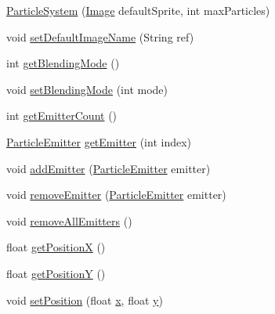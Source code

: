 \begin{DoxyCompactItemize}
\item 
\mbox{\hyperlink{classorg_1_1newdawn_1_1slick_1_1particles_1_1_particle_system_acee608ecfa74e7602861cef95dfae8dd}{Particle\+System}} (\mbox{\hyperlink{classorg_1_1newdawn_1_1slick_1_1_image}{Image}} default\+Sprite, int max\+Particles)
\item 
void \mbox{\hyperlink{classorg_1_1newdawn_1_1slick_1_1particles_1_1_particle_system_a0751d21135054b0561cc37458ff27a36}{set\+Default\+Image\+Name}} (String ref)
\item 
int \mbox{\hyperlink{classorg_1_1newdawn_1_1slick_1_1particles_1_1_particle_system_a236dff7c4fa345081ab47b125585a143}{get\+Blending\+Mode}} ()
\item 
void \mbox{\hyperlink{classorg_1_1newdawn_1_1slick_1_1particles_1_1_particle_system_a430d7e9a09b132694497f4e6075cd58c}{set\+Blending\+Mode}} (int mode)
\item 
int \mbox{\hyperlink{classorg_1_1newdawn_1_1slick_1_1particles_1_1_particle_system_a3103b9ed9a7b4a1f3316a94233092966}{get\+Emitter\+Count}} ()
\item 
\mbox{\hyperlink{interfaceorg_1_1newdawn_1_1slick_1_1particles_1_1_particle_emitter}{Particle\+Emitter}} \mbox{\hyperlink{classorg_1_1newdawn_1_1slick_1_1particles_1_1_particle_system_a97e9702f67b46027303ab8e04bf120d3}{get\+Emitter}} (int index)
\item 
void \mbox{\hyperlink{classorg_1_1newdawn_1_1slick_1_1particles_1_1_particle_system_abeb4a1cb7f8677cf28b82f1e49f1f0ce}{add\+Emitter}} (\mbox{\hyperlink{interfaceorg_1_1newdawn_1_1slick_1_1particles_1_1_particle_emitter}{Particle\+Emitter}} emitter)
\item 
void \mbox{\hyperlink{classorg_1_1newdawn_1_1slick_1_1particles_1_1_particle_system_a3c9ae5911ddadcb0436e5f858c6ecc43}{remove\+Emitter}} (\mbox{\hyperlink{interfaceorg_1_1newdawn_1_1slick_1_1particles_1_1_particle_emitter}{Particle\+Emitter}} emitter)
\item 
void \mbox{\hyperlink{classorg_1_1newdawn_1_1slick_1_1particles_1_1_particle_system_a796dd48f87a0505b2db585fdbff38305}{remove\+All\+Emitters}} ()
\item 
float \mbox{\hyperlink{classorg_1_1newdawn_1_1slick_1_1particles_1_1_particle_system_a19afb04e1ce4b7f39ef5d55beec21b94}{get\+PositionX}} ()
\item 
float \mbox{\hyperlink{classorg_1_1newdawn_1_1slick_1_1particles_1_1_particle_system_adfd5e2b9a2c84d5791462df95bc22f89}{get\+PositionY}} ()
\item 
void \mbox{\hyperlink{classorg_1_1newdawn_1_1slick_1_1particles_1_1_particle_system_a2591ccf6dfe2edfee2d53df57473020b}{set\+Position}} (float \mbox{\hyperlink{classorg_1_1newdawn_1_1slick_1_1particles_1_1_particle_system_a3a332738b4f587da66ea20842e5745cc}{x}}, float \mbox{\hyperlink{classorg_1_1newdawn_1_1slick_1_1particles_1_1_particle_system_a507fdd9d8d8f431e3d70ec770e6f9bb7}{y}})

\end{DoxyCompactItemize}
